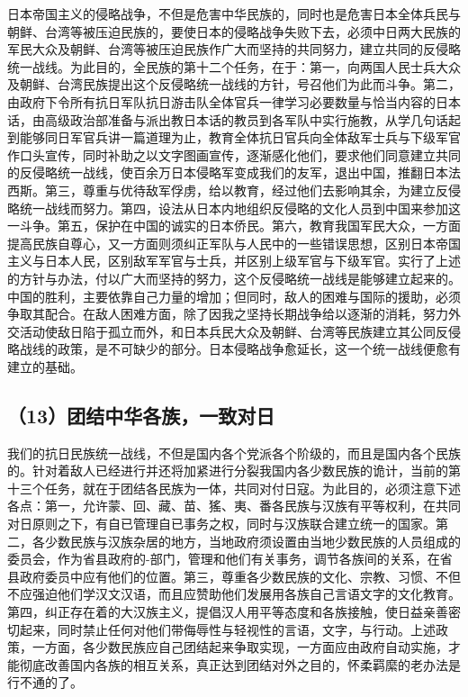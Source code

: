 日本帝国主义的侵略战争，不但是危害中华民族的，同时也是危害日本全体兵民与朝鲜、台湾等被压迫民族的，要使日本的侵略战争失败下去，必须中日两大民族的军民大众及朝鲜、台湾等被压迫民族作广大而坚持的共同努力，建立共同的反侵略统一战线。为此目的，全民族的第十二个任务，在于：第一，向两国人民士兵大众及朝鲜、台湾民族提出这个反侵略统一战线的方针，号召他们为此而斗争。第二，由政府下令所有抗日军队抗日游击队全体官兵一律学习必要数量与恰当内容的日本话，由高级政治部准备与派出教日本话的教员到各军队中实行施教，从学几句话起到能够同日军官兵讲一篇道理为止，教育全体抗日官兵向全体敌军士兵与下级军官作口头宣传，同时补助之以文字图画宣传，逐渐感化他们，要求他们同意建立共同的反侵略统一战线，使百余万日本侵略军变成我们的友军，退出中国，推翻日本法西斯。第三，尊重与优待敌军俘虏，给以教育，经过他们去影响其余，为建立反侵略统一战线而努力。第四，设法从日本内地组织反侵略的文化人员到中国来参加这一斗争。第五，保护在中国的诚实的日本侨民。第六，教育我国军民大众，一方面提高民族自尊心，又一方面则须纠正军队与人民中的一些错误思想，区别日本帝国主义与日本人民，区别敌军军官与士兵，并区别上级军官与下级军官。实行了上述的方针与办法，付以广大而坚持的努力，这个反侵略统一战线是能够建立起来的。中国的胜利，主要依靠自己力量的增加；但同时，敌人的困难与国际的援助，必须争取其配合。在敌人困难方面，除了因我之坚持长期战争给以逐渐的消耗，努力外交活动使敌日陷于孤立而外，和日本兵民大众及朝鲜、台湾等民族建立其公同反侵略战线的政策，是不可缺少的部分。日本侵略战争愈延长，这一个统一战线便愈有建立的基础。

\subsection{（13）团结中华各族，一致对日}

我们的抗日民族统一战线，不但是国内各个党派各个阶级的，而且是国内各个民族的。针对着敌人已经进行并还将加紧进行分裂我国内各少数民族的诡计，当前的第十三个任务，就在于团结各民族为一体，共同对付日寇。为此目的，必须注意下述各点：第一，允许蒙、回、藏、苗、猺、夷、番各民族与汉族有平等权利，在共同对日原则之下，有自已管理自已事务之权，同时与汉族联合建立统一的国家。第二，各少数民族与汉族杂居的地方，当地政府须设置由当地少数民族的人员组成的委员会，作为省县政府的-部门，管理和他们有关事务，调节各族间的关系，在省县政府委员中应有他们的位置。第三，尊重各少数民族的文化、宗教、习惯、不但不应强迫他们学汉文汉语，而且应赞助他们发展用各族自己言语文字的文化教育。第四，纠正存在着的大汉族主义，提倡汉人用平等态度和各族接触，使日益亲善密切起来，同时禁止任何对他们带侮辱性与轻视性的言语，文字，与行动。上述政策，一方面，各少数民族应自己团结起来争取实现，一方面应由政府自动实施，才能彻底改善国内各族的相互关系，真正达到团结对外之目的，怀柔羁縻的老办法是行不通的了。


